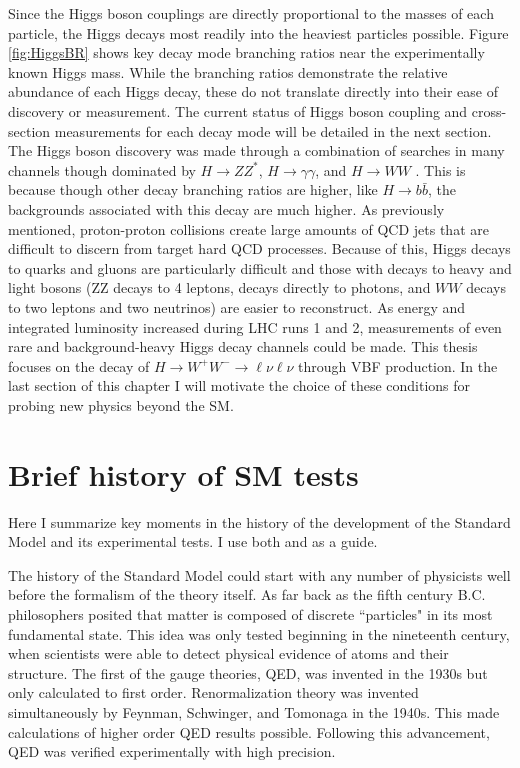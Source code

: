 Since the Higgs boson couplings are directly proportional to the masses of each particle, the Higgs decays most readily into the heaviest particles possible. Figure \ref{fig:HiggsBR} shows key decay mode branching ratios near the experimentally known Higgs mass. While the branching ratios demonstrate the relative abundance of each Higgs decay, these do not translate directly into their ease of discovery or measurement. The current status of Higgs boson coupling and cross-section measurements for each decay mode will be detailed in the next section. The Higgs boson discovery was made through a combination of searches in many channels though dominated by $H\rightarrow ZZ^*$, $H\rightarrow\gamma\gamma$, and $H\rightarrow WW$ \cite{Higgsdiscovery}. This is because though other decay branching ratios are higher, like $H\rightarrow b\bar{b}$, the backgrounds associated with this decay are much higher. As previously mentioned, proton-proton collisions create large amounts of QCD jets that are difficult to discern from target hard QCD processes. Because of this, Higgs decays to quarks and gluons are particularly difficult and those with decays to heavy and light bosons (ZZ decays to 4 leptons, decays directly to photons, and $WW$ decays to two leptons and two neutrinos) are easier to reconstruct. As energy and integrated luminosity increased during LHC runs 1 and 2, measurements of even rare and background-heavy Higgs decay channels could be made.  This thesis focuses on the decay of $H\rightarrow W^+W^-\rightarrow \ell\nu\ell\nu$ through VBF production. In the last section of this chapter I will motivate the choice of these conditions for probing new physics beyond the SM.   

\section{Brief history of SM tests}
Here I summarize key moments in the history of the development of the Standard Model and its experimental tests. I use both \cite{Kibble} and \cite{HistoryBook} as a guide.

The history of the Standard Model could start with any number of physicists well before the formalism of the theory itself. As far back as the fifth century B.C. philosophers posited that matter is composed of discrete ``particles" in its most fundamental state. This idea was only tested beginning in the nineteenth century, when scientists were able to detect physical evidence of atoms and their structure. The first of the gauge theories, QED, was invented in the 1930s but only calculated to first order. Renormalization theory was invented simultaneously by Feynman, Schwinger, and Tomonaga in the 1940s. This made calculations of higher order QED results possible. Following this advancement, QED was verified experimentally with high precision. 

